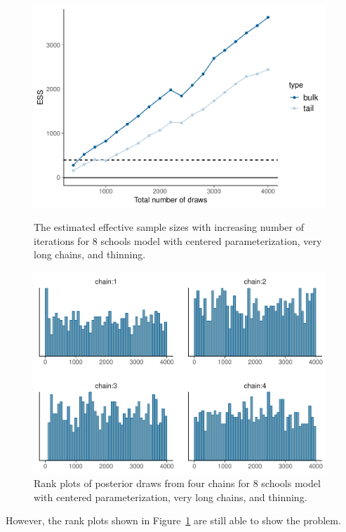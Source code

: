 \documentclass[american,]{article}
\begin{document}
\begin{figure}[tp]
  \centering
  \begin{minipage}{0.48\textwidth}
  \includegraphics[width=0.98\textwidth]{graphics/change-ess-fit-cp4-tau-1.pdf}
  \caption{The estimated effective sample sizes with increasing number of iterations for 8 schools model with centered parameterization, very long chains, and thinning.}
  \label{fig:change-ess-fit-cp4-tau-1}
\end{minipage}
\hfill
  \begin{minipage}{0.48\textwidth}
  \includegraphics[width=0.98\textwidth]{graphics/hist-fit-cp4-tau-1.pdf}
  \caption{Rank plots of posterior draws from four chains for 8
    schools model with centered parameterization, very long chains, and
    thinning.}
  \label{fig:hist-fit-cp4-tau-1}
\end{minipage}
\end{figure}
However, the rank plots shown in Figure~\ref{fig:hist-fit-cp4-tau-1}
are still able to show the problem.
\end{document}
